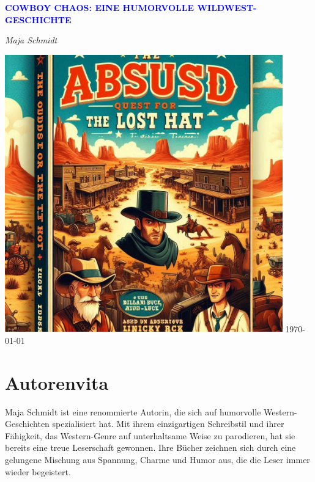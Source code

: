 \documentclass[12pt]{article} %
\begin{document}
\begin{titlepage}
    \centering
    \vspace*{3cm}
    {\Huge\bfseries\textcolor{blue}{\MakeUppercase{ Cowboy Chaos: Eine humorvolle Wildwest-Geschichte }}\par} %
    \vspace{0.5cm} %
    {\Large\textit{ Maja Schmidt }\par} %
    \vfill
    \includegraphics[width=0.9\textwidth]{ cover.jpg } %
    \vfill
    \today
\end{titlepage}

\section*{Autorenvita}
\vspace{4cm} %
\begin{minipage}{\textwidth}
    Maja Schmidt ist eine renommierte Autorin, die sich auf humorvolle Western-Geschichten spezialisiert hat. Mit ihrem einzigartigen Schreibstil und ihrer Fähigkeit, das Western-Genre auf unterhaltsame Weise zu parodieren, hat sie bereits eine treue Leserschaft gewonnen. Ihre Bücher zeichnen sich durch eine gelungene Mischung aus Spannung, Charme und Humor aus, die die Leser immer wieder begeistert.
\end{minipage}
\end{document}
